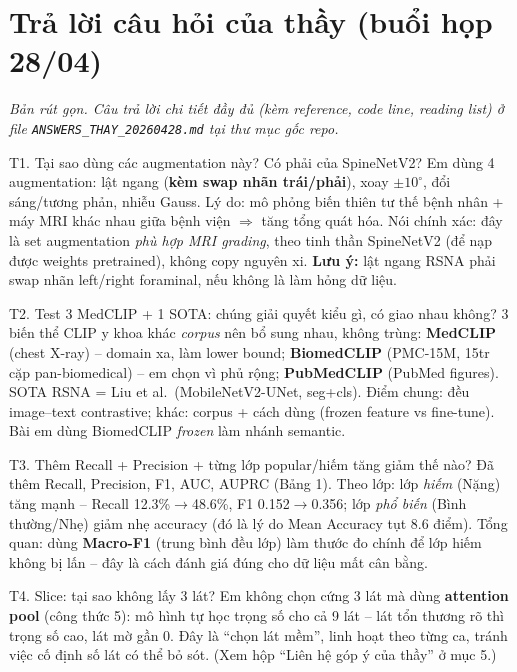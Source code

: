 \documentclass[12pt,a4paper]{article}
\begin{document}
\section{Trả lời câu hỏi của thầy (buổi họp 28/04)}
\emph{Bản rút gọn. Câu trả lời chi tiết đầy đủ (kèm reference, code line, reading list) ở file \texttt{ANSWERS\_THAY\_20260428.md} tại thư mục gốc repo.}

\begin{qabox}{T1. Tại sao dùng các augmentation này? Có phải của SpineNetV2?}
Em dùng 4 augmentation: lật ngang (\textbf{kèm swap nhãn trái/phải}), xoay $\pm10^\circ$, đổi sáng/tương phản, nhiễu Gauss. Lý do: mô phỏng biến thiên tư thế bệnh nhân + máy MRI khác nhau giữa bệnh viện $\Rightarrow$ tăng tổng quát hóa. Nói chính xác: đây là set augmentation \emph{phù hợp MRI grading}, theo tinh thần SpineNetV2 (để nạp được weights pretrained), không copy nguyên xi. \textbf{Lưu ý:} lật ngang RSNA phải swap nhãn left/right foraminal, nếu không là làm hỏng dữ liệu.
\end{qabox}

\begin{qabox}{T2. Test 3 MedCLIP + 1 SOTA: chúng giải quyết kiểu gì, có giao nhau không?}
3 biến thể CLIP y khoa khác \emph{corpus} nên bổ sung nhau, không trùng: \textbf{MedCLIP} (chest X-ray) -- domain xa, làm lower bound; \textbf{BiomedCLIP} (PMC-15M, 15tr cặp pan-biomedical) -- em chọn vì phủ rộng; \textbf{PubMedCLIP} (PubMed figures). SOTA RSNA = Liu et al.\ (MobileNetV2-UNet, seg+cls). Điểm chung: đều image--text contrastive; khác: corpus + cách dùng (frozen feature vs fine-tune). Bài em dùng BiomedCLIP \emph{frozen} làm nhánh semantic.
\end{qabox}

\begin{qabox}{T3. Thêm Recall + Precision + từng lớp popular/hiếm tăng giảm thế nào?}
Đã thêm Recall, Precision, F1, AUC, AUPRC (Bảng 1). Theo lớp: lớp \emph{hiếm} (Nặng) tăng mạnh -- Recall 12.3\%$\to$48.6\%, F1 0.152$\to$0.356; lớp \emph{phổ biến} (Bình thường/Nhẹ) giảm nhẹ accuracy (đó là lý do Mean Accuracy tụt 8.6 điểm). Tổng quan: dùng \textbf{Macro-F1} (trung bình đều lớp) làm thước đo chính để lớp hiếm không bị lấn -- đây là cách đánh giá đúng cho dữ liệu mất cân bằng.
\end{qabox}

\begin{qabox}{T4. Slice: tại sao không lấy 3 lát?}
Em không chọn cứng 3 lát mà dùng \textbf{attention pool} (công thức 5): mô hình tự học trọng số cho cả 9 lát -- lát tổn thương rõ thì trọng số cao, lát mờ gần 0. Đây là ``chọn lát mềm'', linh hoạt theo từng ca, tránh việc cố định số lát có thể bỏ sót. (Xem hộp ``Liên hệ góp ý của thầy'' ở mục 5.)
\end{qabox}
\end{document}

